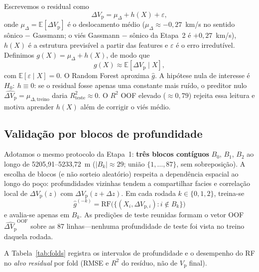 \documentclass[11pt,a4paper]{article}
\numberwithin{equation}{section}
\newcommand{\Vp}{\ensuremath{V_{\mathrm{p}}}}
\begin{document}
Escrevemos o residual como
\begin{equation}
  \label{eq:dvp_decomp}
  \Delta V_{\mathrm{p}}
  =
  \mu_{\Delta} + h(X) + \varepsilon,
\end{equation}
onde $\mu_{\Delta}=\mathbb{E}[\Delta V_{\mathrm{p}}]$ é o deslocamento médio
($\mu_{\Delta}\approx -0{,}27$~km/s no sentido
sônico $-$ Gassmann; o viés Gassmann $-$ sônico da Etapa~2 é
$+0{,}27$~km/s),
$h(X)$ é a estrutura previsível a partir das features e
$\varepsilon$ é o erro irredutível.
Definimos $g(X)=\mu_{\Delta}+h(X)$, de modo que
\begin{equation}
  g(X)\approx\mathbb{E}[\Delta V_{\mathrm{p}}\mid X],
\end{equation}
com $\mathbb{E}[\varepsilon\mid X]=0$.
O Random Forest aproxima $\widehat{g}$.
A hipótese nula de interesse é $H_0:\ h\equiv 0$:
se o residual fosse apenas uma constante mais ruído, o preditor nulo
$\widehat{\Delta V_{\mathrm{p}}}=\mu_{\Delta,\mathrm{treino}}$
daria $R^2_{\mathrm{teste}}\approx 0$.
O $R^2$ OOF elevado ($\approx 0{,}79$) rejeita essa leitura e motiva
aprender $h(X)$ além de corrigir o viés médio.

\subsection{Validação por blocos de profundidade}

Adotamos o mesmo protocolo da Etapa~1: \textbf{três blocos contíguos}
$B_0$, $B_1$, $B_2$ ao longo de 5205,91--5233,72~m
($\lvert B_k\rvert\approx 29$; união $\{1,\ldots,87\}$, sem sobreposição).
A escolha de blocos (e não sorteio aleatório) respeita a dependência espacial
ao longo do poço: profundidades vizinhas tendem a compartilhar facies e
correlação local de $\Delta V_{\mathrm{p}}(z)$ com
$\Delta V_{\mathrm{p}}(z+\Delta z)$.
Em cada rodada $k\in\{0,1,2\}$, treina-se
\begin{equation}
  \widehat{g}^{(-k)}
  =
  \mathrm{RF}\bigl(
    \{(X_i,\Delta V_{\mathrm{p},i}): i\notin B_k\}
  \bigr)
\end{equation}
e avalia-se apenas em $B_k$.
As predições de teste reunidas formam o vetor OOF
$\widehat{\Delta V_{\mathrm{p}}}^{\mathrm{OOF}}$
sobre as 87 linhas---nenhuma profundidade de teste foi vista no treino
daquela rodada.

A Tabela~\ref{tab:folds} registra os intervalos de profundidade e o desempenho
do RF no \emph{alvo residual} por fold (RMSE e $R^2$ do resíduo, não de
\Vp{} final).
\end{document}
